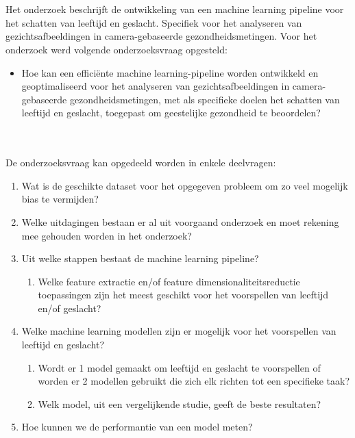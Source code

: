 \section{}%
\label{sec:onderzoeksvraag}
Het onderzoek beschrijft de ontwikkeling van een machine learning pipeline voor het schatten van leeftijd en geslacht. Specifiek voor het analyseren van gezichtsafbeeldingen in camera-gebaseerde gezondheidsmetingen. Voor het onderzoek werd volgende onderzoeksvraag opgesteld: 
\begin{itemize}
    \item Hoe kan een efficiënte machine learning-pipeline worden ontwikkeld en geoptimaliseerd voor het analyseren van gezichtsafbeeldingen in camera-gebaseerde gezondheidsmetingen, met als specifieke doelen het schatten van leeftijd en geslacht, toegepast om geestelijke gezondheid te beoordelen?
\end{itemize} \\
\\
De onderzoeksvraag kan opgedeeld worden in enkele deelvragen:

\begin{enumerate}
    \item Wat is de geschikte dataset voor het opgegeven probleem om zo veel mogelijk bias te vermijden? 
    \item Welke uitdagingen bestaan er al uit voorgaand onderzoek en moet rekening mee gehouden worden in het onderzoek?
    \item Uit welke stappen bestaat de machine learning pipeline?
     \begin{enumerate}
         \item Welke feature extractie en/of feature dimensionaliteitsreductie toepassingen zijn het meest geschikt voor het voorspellen van leeftijd en/of geslacht?
     \end{enumerate}
    \item Welke machine learning modellen zijn er mogelijk voor het voorspellen van leeftijd en geslacht? 
     \begin{enumerate}
        \item Wordt er 1 model gemaakt om leeftijd en geslacht te voorspellen of worden er 2 modellen gebruikt die zich elk richten tot een specifieke taak?
        \item Welk model, uit een vergelijkende studie, geeft de beste resultaten?
    \end{enumerate}
    \item Hoe kunnen we de performantie van een model meten?
    
\end{enumerate}



